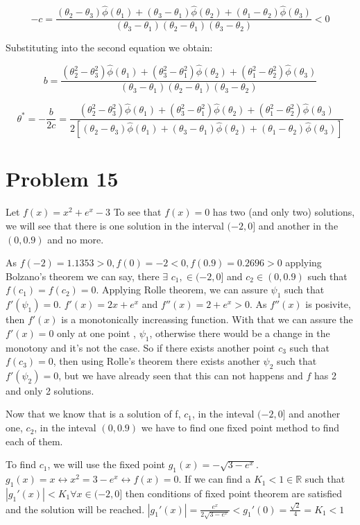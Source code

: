 \documentclass[12pt,letterpaper]{article}
\theoremstyle{definition}
\begin{document}
$$
-c= \frac{(\theta_2-\theta_3)\hat{\phi}(\theta_1) + (\theta_3-\theta_1)\hat{\phi}(\theta_2)+ (\theta_1-\theta_2)\hat{\phi}(\theta_3)}{(\theta_3-\theta_1)(\theta_2-\theta_1) (\theta_3-\theta_2)} <0
$$

Substituting into the second equation we obtain:

$$
b =  \frac{(\theta_2^2-\theta_3^2)\hat{\phi}(\theta_1) + (\theta_3^2-\theta_1^2)\hat{\phi}(\theta_2)+ (\theta_1^2-\theta_2^2)\hat{\phi}(\theta_3)}{(\theta_3-\theta_1)(\theta_2-\theta_1) (\theta_3-\theta_2)}
$$

$$
\theta^{*} = - \frac{b}{2c} = \frac{(\theta_2^2-\theta_3^2)\hat{\phi}(\theta_1) + (\theta_3^2-\theta_1^2)\hat{\phi}(\theta_2)+ (\theta_1^2-\theta_2^2)\hat{\phi}(\theta_3)}{2[(\theta_2-\theta_3)\hat{\phi}(\theta_1) + (\theta_3-\theta_1)\hat{\phi}(\theta_2) + (\theta_1-\theta_2)\hat{\phi}(\theta_3)]}
$$
\section*{Problem 15}
Let $f(x) = x^2 + e^x -3 $
\vspace{0.5cm}
    To see that $f(x)=0$ has two (and only two) solutions, we will see that there is one solution in the interval $ ( -2, 0]$ and another in the $(0,0.9)$ and no more.

    As $f(-2) = 1.1353 >0 , f(0) =-2 <0, f(0.9) = 0.2696>0 $ applying  Bolzano's theorem we can say, there $\exists$  $c_1, \in ( -2, 0]$ and $c_2 \in (0, 0.9)$ such that $f(c_1) = f(c_2)=0$. Applying Rolle theorem, we can assure $\psi_1$ such that $f'(\psi_1) = 0$. $f'(x) = 2x + e^x $ and $f''(x) = 2 + e^x >0$. As $f''(x)$ is posivite, then $f'(x)$ is a monotonically increassing function. With that we can assure the $f'(x) = 0$ only at one point , $\psi_1$, otherwise there would be a change in the monotony and it's not the case. So if there exists another point $c_3$ such that $f(c_3)=0$, then using Rolle's theorem there exists another $\psi_2$ such that $f'(\psi_2)=0$, but we have already seen that this can not happens and $f$ has 2 and only 2 solutions.  

\vspace{0.5cm}

    Now that we know that is a solution of f, $c_1$, in the inteval $( -2, 0]$ and another one, $c_2$, in the inteval $(0, 0.9)$ we have to find one fixed point method to find each of them. 

    To find $c_1$, we will use the fixed point $g_1(x) =- \sqrt{3- e^x}$. 
    $g_1(x)=x \leftrightarrow x^2 = 3- e^x \leftrightarrow f(x) =0$. If we can find a $K_1 <1 \in \mathbb{R}$ such that $|g_1'(x)|<K_1 \forall x \in ( -2, 0]$ then conditions of fixed point theorem are satisfied and the solution will be reached.  
$|g_1'(x)| = \frac{e^x}{2\sqrt{3-e^x}} < g_1'(0) = \frac{\sqrt{2}}{4} = K_1 < 1$
\end{document}
